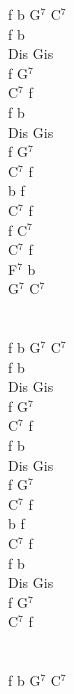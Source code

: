 \documentclass[a5paper, 10pt]{book}
\begin{document}
\begin{minipage}[t]{0.2\textwidth}
  f b G$^7$ C$^7$\\

  f b\\
  Dis Gis\\
  f G$^7$\\
  C$^7$ f\\

  f b\\
  Dis Gis\\
  f G$^7$\\
  C$^7$ f\\

  b f\\
  C$^7$ f\\

  f C$^7$\\
  C$^7$ f\\
  F$^7$ b\\
  G$^7$ C$^7$\\
  \\
  \\
  f b G$^7$ C$^7$\\

  f b\\
  Dis Gis\\
  f G$^7$\\
  C$^7$ f\\

  f b\\
  Dis Gis\\
  f G$^7$\\
  C$^7$ f\\

  b f\\
  C$^7$ f\\

  f b\\
  Dis Gis\\
  f G$^7$\\
  C$^7$ f\\
  \\
  \\
  f b G$^7$ C$^7$\\
\end{minipage}

\newpage
\end{document}
